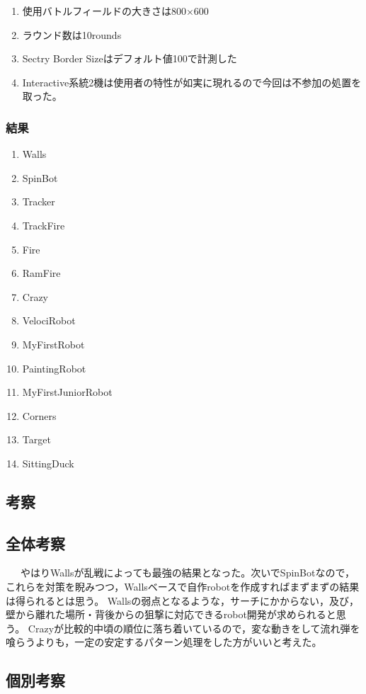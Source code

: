 \documentclass[12pt]{jarticle} %
\begin{document}
\begin{flushleft}
\begin{enumerate}
\item 使用バトルフィールドの大きさは800×600
\item ラウンド数は10rounds
\item Sectry Border Sizeはデフォルト値100で計測した
\item Interactive系統2機は使用者の特性が如実に現れるので今回は不参加の処置を取った。
\end{enumerate}

\subsubsection{結果}
\begin{enumerate}
\item Walls
\item SpinBot
\item Tracker
\item TrackFire
\item Fire
\item RamFire
\item Crazy
\item VelociRobot
\item MyFirstRobot
\item PaintingRobot
\item MyFirstJuniorRobot
\item Corners
\item Target
\item SittingDuck
\end{enumerate}
\hrulefill

\subsection{考察}
\subsection{全体考察}
\ \ \  やはりWallsが乱戦によっても最強の結果となった。次いでSpinBotなので，これらを対策を睨みつつ，Wallsベースで自作robotを作成すればまずまずの結果は得られるとは思う。
Wallsの弱点となるような，サーチにかからない，及び，壁から離れた場所・背後からの狙撃に対応できるrobot開発が求められると思う。
 Crazyが比較的中頃の順位に落ち着いているので，変な動きをして流れ弾を喰らうよりも，一定の安定するパターン処理をした方がいいと考えた。
 
 \subsection{個別考察}
 

\end{flushleft}
\end{document}
